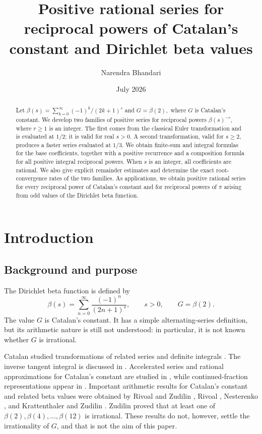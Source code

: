 \documentclass[11pt,reqno]{amsart}
\title[Reciprocal powers of Catalan's constant]
{Positive rational series for reciprocal powers of Catalan's constant
and Dirichlet beta values}
\author{Narendra Bhandari}
\date{July 2026}
\numberwithin{equation}{section}
\theoremstyle{definition}
\theoremstyle{remark}
\newcommand{\Gconst}{G}
\begin{document}
\begin{abstract}
Let
\(
\beta(s)=\sum_{k=0}^{\infty}{(-1)^k}/{(2k+1)^s}\) and \(
\Gconst=\beta(2),
\)
where \(\Gconst\) is Catalan's constant.  We develop two families of
positive series for reciprocal powers \(\beta(s)^{-r}\), where
\(r\geq1\) is an integer.  The first
comes from the classical Euler transformation and is evaluated at
\(1/2\); it is valid for real \(s>0\).  A second transformation, valid
for \(s\geq2\), produces a faster series evaluated at \(1/3\).  We
obtain finite-sum and integral formulas for the base coefficients,
together with a positive recurrence and a composition formula for
all positive integral reciprocal powers.  When \(s\) is an integer, all
coefficients are rational.  We also give explicit remainder estimates
and determine the exact root-convergence rates of the two families.
As applications, we obtain positive rational series for every
reciprocal power of Catalan's constant and for reciprocal powers of
\(\pi\) arising from odd values of the Dirichlet beta function.
\end{abstract}
\maketitle
\vspace{-0.9\baselineskip}
\section{Introduction}
\label{sec:introduction}

\subsection{Background and purpose}

The Dirichlet beta function is defined by
\begin{equation}\label{eq:G-definition}
 \beta(s)
 =
\sum_{n=0}^{\infty}\frac{(-1)^n}{(2n+1)^s},
 \qquad s>0,
 \qquad
 \Gconst=\beta(2).
\end{equation}
The value \(\Gconst\) is Catalan's constant.  It has a simple
alternating-series definition, but its arithmetic nature is still not
understood: in particular, it is not known whether \(\Gconst\) is
irrational.

Catalan studied transformations of related series and definite
integrals \cite{Catalan1867}.  The inverse tangent integral is discussed
in \cite{Ramanujan1915,Lewin1981,Campbell2022}.  Accelerated series and
rational approximations for Catalan's constant are studied in
\cite{Bradley1999}, while continued-fraction representations appear in
\cite{BowmanMcLaughlin2002,Zudilin2003}.  Important arithmetic results for Catalan's constant and related beta values were obtained by Rivoal and
Zudilin \cite{RivoalZudilin2003}, Rivoal \cite{Rivoal2006},
Nesterenko \cite{Nesterenko2016}, and Krattenthaler and Zudilin
\cite{KrattenthalerZudilin2019}.  Zudilin
\cite[Thm.~1]{Zudilin2019} proved that at least one of
\(\beta(2),\beta(4),\ldots,\beta(12)\) is irrational.  These results
do not, however, settle the irrationality of \(\Gconst\), and that is
not the aim of this paper.
\end{document}
